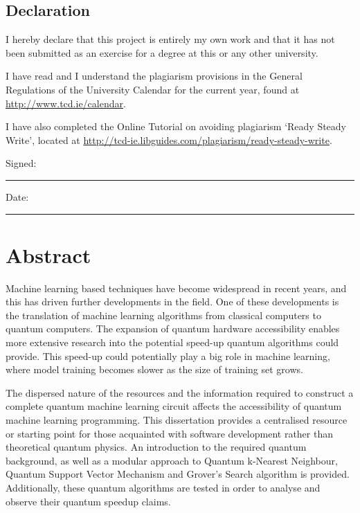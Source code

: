 \documentclass[a4paper,oneside,12pt]{book}
\title{\thesistitle}
\author{\authorname}
\begin{document}

\section*{\Huge{Declaration}}
\vspace{1cm}
I hereby declare that this project is entirely my own work and that it has not been submitted as an exercise for a degree at this or any other university.

\vspace{1cm}
I have read and I understand the plagiarism provisions in the General Regulations of the University Calendar for the current year, found at \url{http://www.tcd.ie/calendar}.
\vspace{1cm}

I have also completed the Online Tutorial on avoiding plagiarism `Ready Steady Write', located at
\url{http://tcd-ie.libguides.com/plagiarism/ready-steady-write}.
\vspace{3cm}

Signed:~\rule{5cm}{0.3pt}\hfill Date:~\rule{5cm}{0.3pt}

\chapter*{Abstract}
Machine learning based techniques have become widespread in recent years, and this has driven further developments in the field. %
One of these developments is the translation of machine learning algorithms from classical computers to quantum computers. The expansion of quantum hardware accessibility enables more extensive research into the potential speed-up quantum algorithms could provide. This speed-up could potentially play a big role in machine learning, where model training becomes slower as the size of training set grows.

The dispersed nature of the resources and the information required to construct a complete quantum machine learning circuit affects the accessibility of quantum machine learning programming. This dissertation provides a centralised resource or starting point for those acquainted with software development rather than theoretical quantum physics. An introduction to the required quantum background, as well as a modular approach to Quantum k-Nearest Neighbour, Quantum Support Vector Mechanism and Grover's Search algorithm is provided. Additionally, these quantum algorithms are tested in order to analyse and observe their quantum speedup claims.
\end{document}
